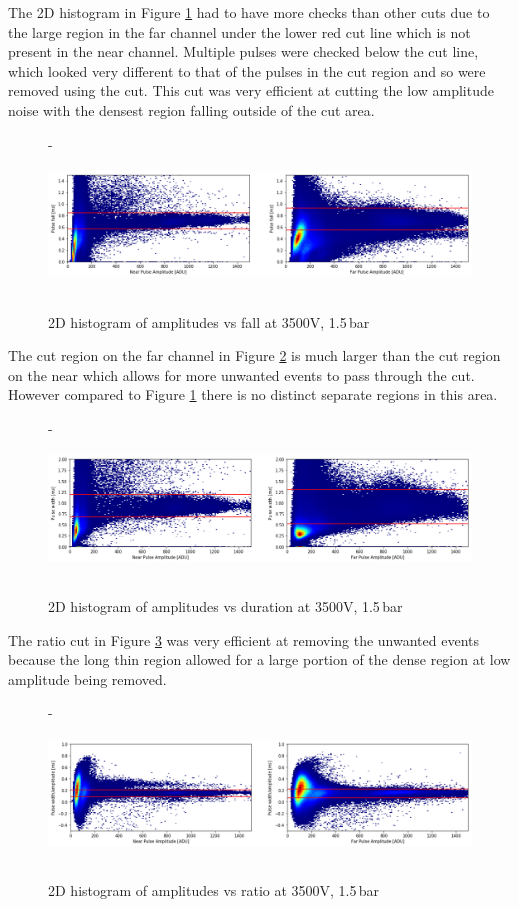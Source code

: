 \documentclass[a4paper]{article}
\begin{document}
\noindent The 2D histogram in Figure \ref{fig:2fall} had to have more checks than other cuts due to the large region in the far channel under the lower red cut line which is not present in the near channel. Multiple pulses were checked below the cut line, which looked very different to that of the pulses in the cut region and so were removed using the cut. This cut was very efficient at cutting the low amplitude noise with the densest region falling outside of the cut area.
\begin{figure}[H]-
\centering
\includegraphics[height=3.7cm]{plots/uk24n002_fall.png}
\caption{2D histogram of amplitudes vs fall at 3500V, 1.5\,bar}
\label{fig:2fall}
\end{figure}
\noindent The cut region on the far channel in Figure \ref{fig:2dur} is much larger than the cut region on the near which allows for more unwanted events to pass through the cut. However compared to Figure \ref{fig:2fall} there is no distinct separate regions in this area.
\begin{figure}[H]-
\centering
\includegraphics[height=3.7cm]{plots/uk24n002_dur.png}
\caption{2D histogram of amplitudes vs duration at 3500V, 1.5\,bar}
\label{fig:2dur}
\end{figure}
\noindent The ratio cut in Figure \ref{fig:2len} was very efficient at removing the unwanted events because the long thin region allowed for a large portion of the dense region at low amplitude being removed.
\begin{figure}[H]-
    \centering
    \includegraphics[height=3.7cm]{plots/uk24n002_len.png}
    \caption{2D histogram of amplitudes vs ratio at 3500V, 1.5\,bar}
    \label{fig:2len}
\end{figure}
\end{document}
